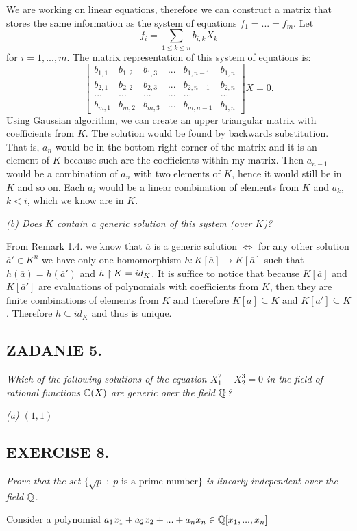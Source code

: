 \documentclass{article}
\begin{document}

We are working on linear equations, therefore we can construct a matrix that stores the same information as the system of equations $f_1=...=f_m$. Let
$$f_i=\sum\limits_{1\leq k\leq n}b_{i, k}X_k$$
for $i=1,...,m$. The matrix representation of this system of equations is:
$$\begin{bmatrix}
    b_{1,1} & b_{1, 2} & b_{1, 3} &... &b_{1, n-1} & b_{1, n}\\
    b_{2,1} & b_{2, 2} & b_{2, 3} &... &b_{2, n-1} & b_{2, n}\\
    ...     &   ...    & ...      &... & ...       & ...\\
    b_{m,1} & b_{m, 2} & b_{m, 3} &... &b_{m, n-1} & b_{1, n}
\end{bmatrix}X=0.$$
Using Gaussian algorithm, we can create an upper triangular matrix with coefficients from $K$. The solution would be found by backwards substitution. That is, $a_n$ would be in the bottom right corner of the matrix and it is an element of $K$ because such are the coefficients within my matrix. Then $a_{n-1}$ would be a combination of $a_n$ with two elements of $K$, hence it would still be in $K$ and so on. Each $a_i$ would be a linear combination of elements from $K$ and $a_k$, $k<i$, which we know are in $K$.

\proofend

\emph{\color{pink}(b) Does $K$ contain a generic solution of this system (over $K$)?}
\smallskip

From Remark 1.4. we know that $\overline{a}$ is a generic solution $\iff$ for any other solution $\overline a'\in K^n$ we have only one homomorphism $h:K[\overline a]\to K[\overline a]$ such that $h(\overline{a})=h(\overline{a}')$ and $h\upharpoonright K=id_K$. It is suffice to notice that because $K[\overline a]$ and $K[\overline a']$ are evaluations of polynomials with coefficients from $K$, then they are finite combinations of elements from $K$ and therefore $K[\overline{a}]\subseteq K$ and $K[\overline a']\subseteq K$. Therefore $h\subseteq id_K$ and thus is unique.

\subsection*{ZADANIE 5.}
\emph{\color{pink}Which of the following solutions of the equation $X_1^2-X_2^3=0$ in the field of rational functions $\mathbb{C}(X)$ are generic over the field $\mathbb{Q}$?}

\emph{\color{pink}(a) $(1, 1)$}

\subsection*{EXERCISE 8.}
\emph{\color{pink}Prove that the set $\{\sqrt{p}\;:\;p\text{ is a prime number}\}$ is linearly independent over the field $\mathbb{Q}$.}
\smallskip

Consider a polynomial $a_1x_1+a_2x_2+...+a_nx_n\in\mathbb{Q}[x_1,...,x_n]$
\end{document}

